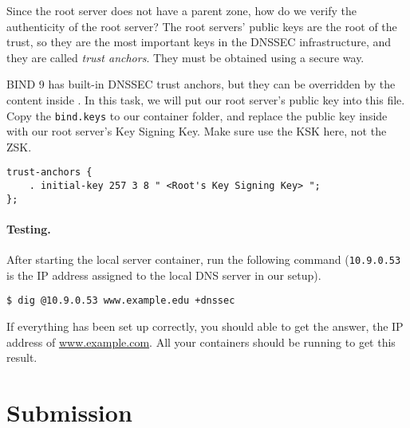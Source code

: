 Since the root server does not have a parent zone, how do we verify the authenticity 
of the root server?  The root servers' public keys are the root of the trust, so they are 
the most important keys in the DNSSEC infrastructure, and they are called \textit{trust
anchors}. They must be obtained using a secure way. 

BIND 9 has built-in DNSSEC trust anchors, but they can be 
overridden by the content inside .  
In this task, we will put our root server's public key 
into this file. Copy the \texttt{bind.keys} to our container folder,
and replace the public key inside with our root server's 
Key Signing Key. Make sure use the KSK here, not the ZSK. 


\begin{lstlisting}
trust-anchors {
    . initial-key 257 3 8 " <Root's Key Signing Key> ";
};
\end{lstlisting}


\paragraph{Testing.} After starting the local server container, run the 
following command (\texttt{10.9.0.53} is the IP address 
assigned to the local DNS server in our setup).

\begin{lstlisting}
$ dig @10.9.0.53 www.example.edu +dnssec
\end{lstlisting}

If everything has been set up correctly, you should able to get the 
answer, the IP address of \url{www.example.com}. All your containers
should be running to get this result. 





\section{Submission}





